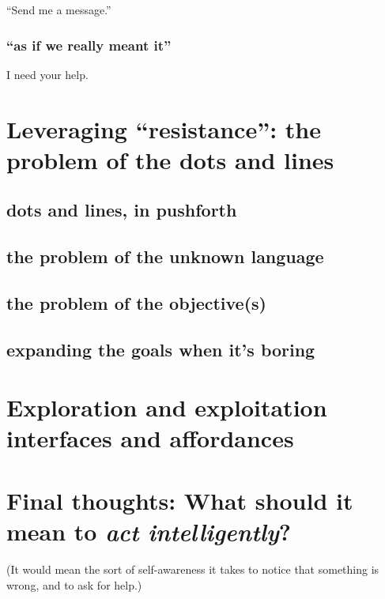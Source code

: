 ``Send me a message.''

\subsubsection{``as if we really meant it''}\hypertarget{as-if-we-really-meant-it-1}{}\label{as-if-we-really-meant-it-1}

I need your help.

\section{Leveraging ``resistance'': the problem of the dots and lines}\hypertarget{leveraging-resistance-the-problem-of-the-dots-and-lines}{}\label{leveraging-resistance-the-problem-of-the-dots-and-lines}

\subsection{dots and lines, in pushforth}\hypertarget{dots-and-lines-in-pushforth}{}\label{dots-and-lines-in-pushforth}

\subsection{the problem of the unknown language}\hypertarget{the-problem-of-the-unknown-language}{}\label{the-problem-of-the-unknown-language}

\subsection{the problem of the objective(s)}\hypertarget{the-problem-of-the-objectives}{}\label{the-problem-of-the-objectives}

\subsection{expanding the goals when it's boring}\hypertarget{expanding-the-goals-when-its-boring}{}\label{expanding-the-goals-when-its-boring}

\section{Exploration and exploitation interfaces and affordances}\hypertarget{exploration-and-exploitation-interfaces-and-affordances}{}\label{exploration-and-exploitation-interfaces-and-affordances}

\section{Final thoughts: What should it mean to \emph{act intelligently}?}\hypertarget{final-thoughts-what-should-it-mean-to-act-intelligently}{}\label{final-thoughts-what-should-it-mean-to-act-intelligently}

(It would mean the sort of self-awareness it takes to notice that something is wrong, and to ask for help.)


